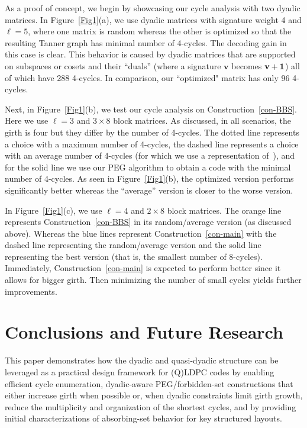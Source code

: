\documentclass[11pt]{article}
\theoremstyle{plain}
\theoremstyle{plain}
\theoremstyle{definition}
\numberwithin{theo}{section}
\newcommand{\bv}{{\mathbf v}}
\newcounter{ara}
\begin{document}
As a proof of concept, we begin by showcasing our cycle analysis with two dyadic matrices. 
In Figure~\ref{Fig1}(a), we use dyadic matrices with signature weight 4 and $\ell = 5$, where one matrix is random whereas the other is optimized so that the resulting Tanner graph has minimal number of 4-cycles.
The decoding gain in this case is clear.
This behavior is caused by dyadic matrices that are supported on subspaces or cosets and their ``duals'' (where a signature $\bv$ becomes $\bv + {\bf 1}$) all of which have 288 4-cycles. 
In comparison, our ``optimized" matrix has only 96 4-cycles.

Next, in Figure~\ref{Fig1}(b), we test our cycle analysis on Construction~\ref{con-BBS}. 
Here we use $\ell=3$ and $3\times 8$ block matrices. As discussed, in all scenarios, the girth is four but they differ by the number of 4-cycles. 
The dotted line represents a choice with a maximum number of 4-cycles, the dashed line represents a choice with an average number of 4-cycles (for which we use a representation of~\cite{BBS26}), and for the solid line we use our PEG algorithm to obtain a code with the minimal number of 4-cycles.
As seen in Figure~\ref{Fig1}(b), the optimized version performs significantly better whereas the ``average'' version is closer to the worse version.

In Figure~\ref{Fig1}(c), we use $\ell = 4$ and $2\times 8$ block matrices. The orange line represents Construction~\ref{con-BBS} in its random/average version (as discussed above). 
Whereas the blue lines represent Construction~\ref{con-main} with the dashed line representing the random/average version and the solid line representing the best version (that is, the smallest number of 8-cycles).
Immediately, Construction~\ref{con-main} is expected to perform better since it allows for bigger girth. Then minimizing the number of small cycles yields further improvements.

\section{Conclusions and Future Research}
\label{sec:conclusions}

This paper demonstrates how the dyadic and quasi-dyadic structure can be leveraged as a practical design framework for (Q)LDPC codes by enabling efficient cycle enumeration, dyadic-aware PEG/forbidden-set constructions that either increase girth when possible or, when dyadic constraints limit girth growth, reduce the multiplicity and organization of the shortest cycles, and by providing initial characterizations of absorbing-set behavior for key structured layouts.  
\end{document}
